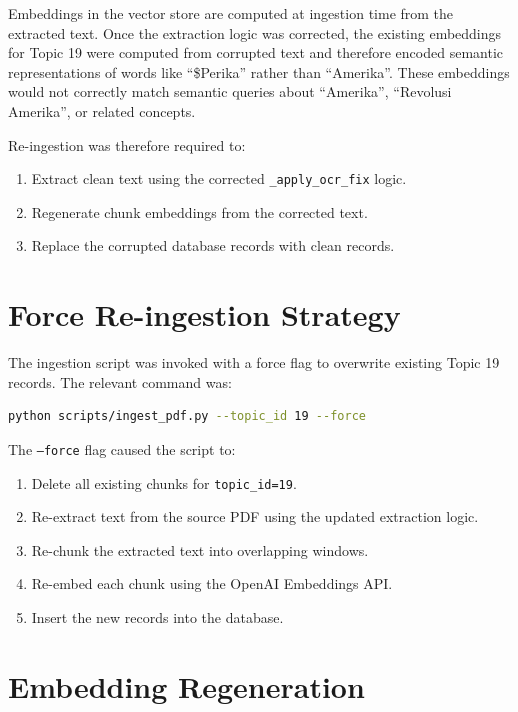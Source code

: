\documentclass[12pt, a4paper]{report}
\newcommand{\codeinline}[1]{\texttt{#1}}
\begin{document}
Embeddings in the vector store are computed at ingestion time from the extracted
text. Once the extraction logic was corrected, the existing embeddings for
Topic 19 were computed from corrupted text and therefore encoded semantic
representations of words like ``\$Perika'' rather than ``Amerika''. These
embeddings would not correctly match semantic queries about ``Amerika'',
``Revolusi Amerika'', or related concepts.

Re-ingestion was therefore required to:
\begin{enumerate}[noitemsep]
  \item Extract clean text using the corrected \codeinline{\_apply\_ocr\_fix} logic.
  \item Regenerate chunk embeddings from the corrected text.
  \item Replace the corrupted database records with clean records.
\end{enumerate}

\section{Force Re-ingestion Strategy}

The ingestion script was invoked with a force flag to overwrite existing
Topic 19 records. The relevant command was:

\begin{lstlisting}[language=bash, caption={Force re-ingestion command}]
python scripts/ingest_pdf.py --topic_id 19 --force
\end{lstlisting}

The \codeinline{--force} flag caused the script to:
\begin{enumerate}[noitemsep]
  \item Delete all existing chunks for \codeinline{topic\_id=19}.
  \item Re-extract text from the source PDF using the updated extraction logic.
  \item Re-chunk the extracted text into overlapping windows.
  \item Re-embed each chunk using the OpenAI Embeddings API.
  \item Insert the new records into the database.
\end{enumerate}

\section{Embedding Regeneration}
\end{document}
